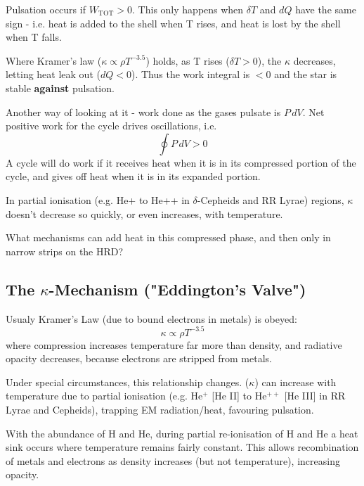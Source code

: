 \documentclass{spy}
\begin{document}
Pulsation occurs if \(W_\mathrm{TOT} > 0\). This only happens when \(\delta T \) and \(dQ\) have the same sign - i.e. heat is added to the shell when T rises, and heat is lost by the shell when T falls. 


Where Kramer's law (\(\kappa \propto \rho T^{-3.5}\)) holds, as T rises (\(\delta T > 0\)), the \(\kappa\) decreases, letting heat leak out (\(dQ<0\)). Thus the work integral is \(<0\) and the star is stable \textbf{against} pulsation. 

Another way of looking at it - work done as the gases pulsate is \(P \,dV\). Net positive work for the cycle drives oscillations, i.e.
\begin{equation}
    \oint P \,dV > 0
\end{equation}
A cycle will do work if it receives heat when it is in its compressed portion of the cycle, and gives off heat when it is in its expanded portion.

 

In partial ionisation (e.g. He+ to He++ in \(\delta\)-Cepheids and RR Lyrae) regions, \(\kappa\) doesn't decrease so quickly, or even increases, with temperature.

What mechanisms can add heat in this compressed phase, and then only in narrow strips on the HRD?



\subsection{The \(\kappa\)-Mechanism ("Eddington's Valve")}
Usualy Kramer's Law (due to bound electrons in metals) is obeyed:
\begin{equation}
    \kappa \propto \rho T^{-3.5}
\end{equation}
where compression increases temperature far more than density, and radiative opacity decreases, because electrons are stripped from metals. 

Under special circumstances, this relationship changes. (\(\kappa\)) can increase with temperature due to partial ionisation (e.g. He\(^+\) [He II] to He\(^{++}\) [He III] in RR Lyrae and Cepheids), trapping EM radiation/heat, favouring pulsation.  

With the abundance of H and He, during partial re-ionisation of H and He a heat sink occurs where temperature remains fairly constant. This allows recombination of metals and electrons as density increases (but not temperature), increasing opacity. 
\end{document}

